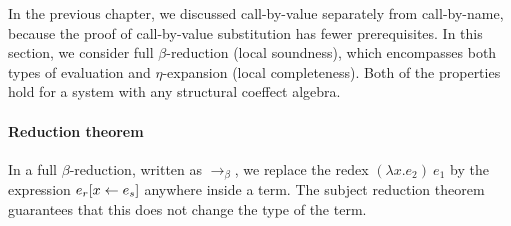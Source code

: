 In the previous chapter, we discussed call-by-value separately from call-by-name, because the
proof of call-by-value substitution has fewer prerequisites. In this section, we consider full
$\beta$-reduction (local soundness), which encompasses both types of evaluation and 
$\eta$-expansion (local completeness). Both of the properties hold for a system with any
structural coeffect algebra.

\paragraph{Reduction theorem}
In a full $\beta$-reduction,
written as $\rightarrow_\beta$, we replace the redex $(\lambda x.e_2)~e_1$ by the
expression $e_r[x \leftarrow e_s]$ anywhere inside a term. The subject reduction theorem
guarantees that this does not change the type of the term.

